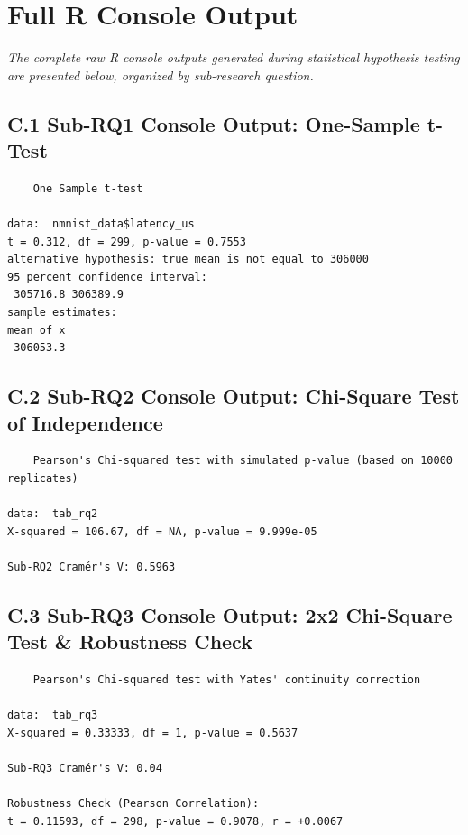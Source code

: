 \newpage

\chapter{Full R Console Output}
\label{app:console_output}

\textit{The complete raw R console outputs generated during statistical hypothesis testing are presented below, organized by sub-research question.}

\section{C.1 Sub-RQ1 Console Output: One-Sample t-Test}
\begin{verbatim}
	One Sample t-test

data:  nmnist_data$latency_us
t = 0.312, df = 299, p-value = 0.7553
alternative hypothesis: true mean is not equal to 306000
95 percent confidence interval:
 305716.8 306389.9
sample estimates:
mean of x 
 306053.3 
\end{verbatim}

\section{C.2 Sub-RQ2 Console Output: Chi-Square Test of Independence}
\begin{verbatim}
	Pearson's Chi-squared test with simulated p-value (based on 10000 replicates)

data:  tab_rq2
X-squared = 106.67, df = NA, p-value = 9.999e-05

Sub-RQ2 Cramér's V: 0.5963
\end{verbatim}

\section{C.3 Sub-RQ3 Console Output: 2x2 Chi-Square Test \& Robustness Check}
\begin{verbatim}
	Pearson's Chi-squared test with Yates' continuity correction

data:  tab_rq3
X-squared = 0.33333, df = 1, p-value = 0.5637

Sub-RQ3 Cramér's V: 0.04

Robustness Check (Pearson Correlation):
t = 0.11593, df = 298, p-value = 0.9078, r = +0.0067
\end{verbatim}

